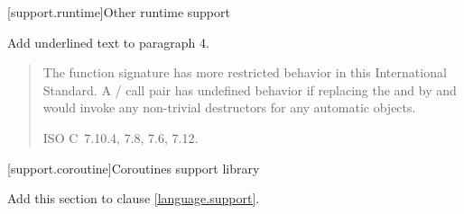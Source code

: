 \setcounter{section}{9}
[support.runtime]{Other runtime support}

Add underlined text to paragraph 4.

\begin{quote}
\setcounter{Paras}{3}
\pnum
The function signature
%
has more restricted behavior in this International Standard.
A / call pair has undefined
behavior if replacing the  and 
by  and  would invoke any non-trivial destructors for any automatic
objects.
%

\xref ISO C~7.10.4, 7.8, 7.6, 7.12.
\end{quote}

\setcounter{section}{10}
[support.coroutine]{Coroutines support library}

Add this section to clause \ref{language.support}.

